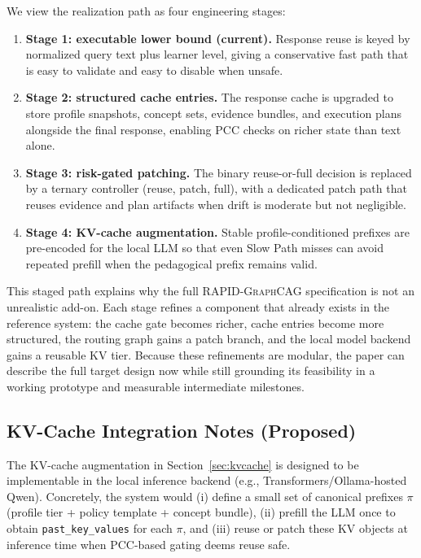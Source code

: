 \documentclass[11pt,a4paper,twocolumn]{article}
\newcommand{\rapid}{\textsc{RAPID-GraphCAG}}
\begin{document}
We view the realization path as four engineering stages:
\begin{enumerate}[leftmargin=*]
  \item \textbf{Stage 1: executable lower bound (current).} Response reuse is keyed by normalized query text plus learner level, giving a conservative fast path that is easy to validate and easy to disable when unsafe.
  \item \textbf{Stage 2: structured cache entries.} The response cache is upgraded to store profile snapshots, concept sets, evidence bundles, and execution plans alongside the final response, enabling PCC checks on richer state than text alone.
  \item \textbf{Stage 3: risk-gated patching.} The binary reuse-or-full decision is replaced by a ternary controller (reuse, patch, full), with a dedicated patch path that reuses evidence and plan artifacts when drift is moderate but not negligible.
  \item \textbf{Stage 4: KV-cache augmentation.} Stable profile-conditioned prefixes are pre-encoded for the local LLM so that even Slow Path misses can avoid repeated prefill when the pedagogical prefix remains valid.
\end{enumerate}

This staged path explains why the full \rapid{} specification is not an unrealistic add-on. Each stage refines a component that already exists in the reference system: the cache gate becomes richer, cache entries become more structured, the routing graph gains a patch branch, and the local model backend gains a reusable KV tier. Because these refinements are modular, the paper can describe the full target design now while still grounding its feasibility in a working prototype and measurable intermediate milestones.

\subsection{KV-Cache Integration Notes (Proposed)}
The KV-cache augmentation in Section~\ref{sec:kvcache} is designed to be implementable in the local inference backend (e.g., Transformers/Ollama-hosted Qwen). Concretely, the system would (i) define a small set of canonical prefixes $\pi$ (profile tier + policy template + concept bundle), (ii) prefill the LLM once to obtain \texttt{past\_key\_values} for each $\pi$, and (iii) reuse or patch these KV objects at inference time when PCC-based gating deems reuse safe.
\end{document}
